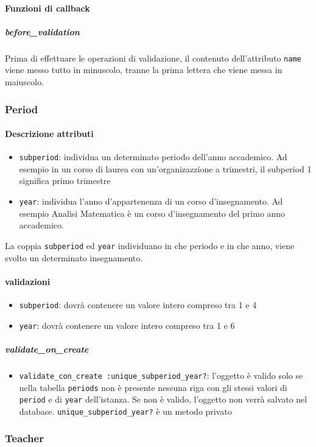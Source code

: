 \documentclass[11pt,a4paper]{article}
\begin{document}
\paragraph{Funzioni di callback}
\subparagraph{before\_validation}
Prima di effettuare le operazioni di validazione, il contenuto dell'attributo \verb|name| viene messo tutto in minuscolo, tranne la prima lettera che viene messa in maiuscolo.
\subsubsection{Period}
\paragraph{Descrizione attributi}
\begin{itemize}
 \item \verb|subperiod|: individua un determinato periodo dell'anno accademico. Ad esempio in un corso di laurea con un'organizazzione a trimestri, il subperiod 1 significa primo trimestre
 \item \verb|year|: individua l'anno d'appartenenza di un corso d'insegnamento. Ad esempio Analisi Matematica è un corso d'insegnamento del primo anno accademico.
\end{itemize}
La coppia \verb|subperiod| ed \verb|year| individuano in che periodo e in che anno, viene svolto un determinato insegnamento.
\paragraph{validazioni}
\begin{itemize}
 \item \verb|subperiod|: dovrà contenere un valore intero compreso tra 1 e 4
\item \verb|year|: dovrà contenere un valore intero compreso tra 1 e 6
\end{itemize}
\subparagraph{validate\_on\_create} 
\begin{itemize}
 \item \verb|validate_con_create :unique_subperiod_year?|: l'oggetto è valido solo se nella tabella \verb|periods| non è presente nessuna riga con gli stessi valori di \verb|period| e di \verb|year| dell'istanza. 
Se non è valido, l'oggetto non verrà salvato nel database. \verb|unique_subperiod_year?| è un metodo privato
\end{itemize}
\subsubsection{Teacher}
\end{document}
